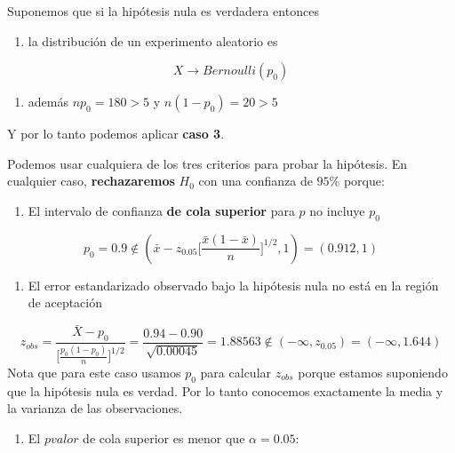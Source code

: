 \documentclass[
]{book}
\providecommand{\tightlist}{%
  \setlength{\itemsep}{0pt}\setlength{\parskip}{0pt}}
\begin{document}
Suponemos que si la hipótesis nula es verdadera entonces

\begin{enumerate}
\def\labelenumi{\arabic{enumi}.}
\tightlist
\item
  la distribución de un experimento aleatorio es
\end{enumerate}

\[X \rightarrow Bernoulli (p_0)\]

\begin{enumerate}
\def\labelenumi{\arabic{enumi}.}
\setcounter{enumi}{1}
\tightlist
\item
  además \(np_0=180>5\) y \(n(1-p_0)=20>5\)
\end{enumerate}

Y por lo tanto podemos aplicar \textbf{caso 3}.

Podemos usar cualquiera de los tres criterios para probar la hipótesis. En cualquier caso, \textbf{rechazaremos} \(H_0\) con una confianza de \(95\%\) porque:

\begin{enumerate}
\def\labelenumi{\arabic{enumi}.}
\tightlist
\item
  El intervalo de confianza \textbf{de cola superior} para \(p\) no incluye \(p_0\)
\end{enumerate}

\[p_0=0.9 \notin (\bar{x}-z_{0.05}\big[\frac{\bar{x}(1-\bar{x})}{n} \big]^{1/2},1)= (0.912,1)\]

\begin{enumerate}
\def\labelenumi{\arabic{enumi}.}
\setcounter{enumi}{1}
\tightlist
\item
  El error estandarizado observado bajo la hipótesis nula no está en la región de aceptación
\end{enumerate}

\[z_{obs}= \frac{\bar{X}-p_0}{\big[\frac{p_0(1-p_0)}{n} \big]^{1/2}} =\frac{0.94 -0.90}{\sqrt{0.00045}}=1.88563 \notin (-\infty, z_{0.05})=(-\infty, 1.644)\]
Nota que para este caso usamos \(p_0\) para calcular \(z_{obs}\) porque estamos suponiendo que la hipótesis nula es verdad. Por lo tanto conocemos exactamente la media y la varianza de las observaciones.

\begin{enumerate}
\def\labelenumi{\arabic{enumi}.}
\setcounter{enumi}{2}
\tightlist
\item
  El \(pvalor\) de cola superior es menor que \(\alpha=0.05\):
\end{enumerate}
\end{document}
